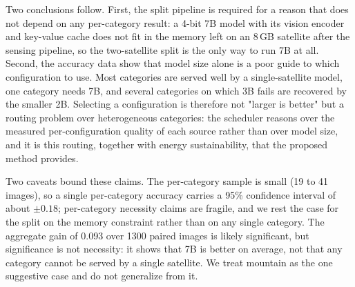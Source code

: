 Two conclusions follow. First, the split pipeline is required for a reason that
does not depend on any per-category result: a 4-bit 7B model with its vision
encoder and key-value cache does not fit in the memory left on an 8\,GB
satellite after the sensing pipeline, so the two-satellite split is the only way
to run 7B at all. Second, the accuracy data show that model size alone is a poor
guide to which configuration to use. Most categories are served well by a
single-satellite model, one category needs 7B, and several categories on which
3B fails are recovered by the smaller 2B. Selecting a configuration is therefore
not "larger is better" but a routing problem over heterogeneous categories: the
scheduler reasons over the measured per-configuration quality of each source
rather than over model size, and it is this routing, together with energy
sustainability, that the proposed method provides.

Two caveats bound these claims. The per-category sample is small (19 to 41
images), so a single per-category accuracy carries a 95\% confidence interval of
about $\pm0.18$; per-category necessity claims are fragile, and we rest the case
for the split on the memory constraint rather than on any single category. The
aggregate gain of 0.093 over 1300 paired images is likely significant, but
significance is not necessity: it shows that 7B is better on average, not that
any category cannot be served by a single satellite. We treat mountain as the
one suggestive case and do not generalize from it.
